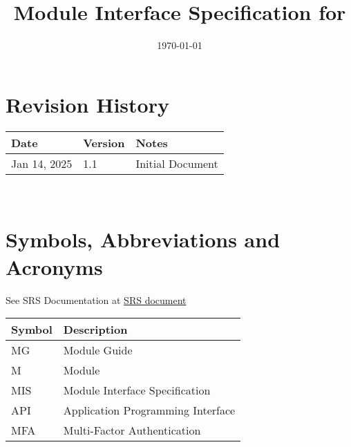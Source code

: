 \documentclass[12pt, titlepage]{article}
\begin{document}
\title{Module Interface Specification for \progname{}}

\author{\authname}

\date{\today}

\maketitle


\section{Revision History}

\begin{tabularx}{\textwidth}{p{3cm}p{2cm}X}
\toprule {\bf Date} & {\bf Version} & {\bf Notes}\\
\midrule
Jan 14, 2025 & 1.1 & Initial Document\\
\bottomrule
\end{tabularx}

~\newpage

\section{Symbols, Abbreviations and Acronyms}

See SRS Documentation at \href{https://github.com/Inreet-Kaur/capstone/blob/main/docs/SRS/SRS.pdf} {SRS document}

\begin{tabularx}{\textwidth}{p{2cm}X}
  \toprule
  {\bf Symbol} & {\bf Description}                                                                                     \\
  \midrule
  MG           & Module Guide                                                                                          \\
  M            & Module                                                                                                \\
  MIS          & Module Interface Specification                                                                        \\
  API          & Application Programming Interface                                                                     \\
  MFA          & Multi-Factor Authentication                                                                           \\
  \bottomrule
\end{tabularx}
\end{document}
